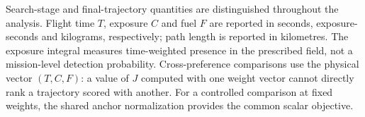 \documentclass[preprint,12pt]{elsarticle}
\begin{document}
Search-stage and final-trajectory quantities are distinguished throughout
the analysis. Flight time $T$, exposure $C$ and fuel $F$ are reported in
seconds, exposure-seconds and kilograms, respectively; path length is
reported in kilometres. The exposure integral measures time-weighted
presence in the prescribed field, not a mission-level detection probability.
Cross-preference comparisons use the physical vector $(T,C,F)$: a value
of $J$ computed with one weight vector cannot directly rank a trajectory
scored with another. For a controlled comparison at fixed weights, the
shared anchor normalization provides the common scalar objective.


\end{document}
